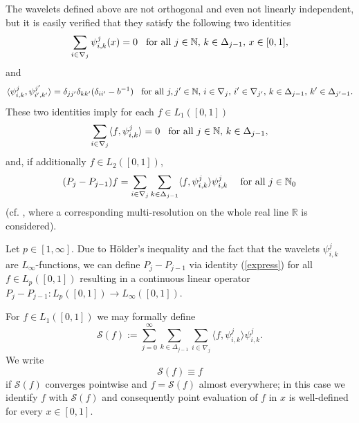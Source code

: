 \documentclass[12pt]{article}
\newcommand{\NN}{\mathbb{N}}
\newcommand{\RR}{\mathbb{R}}
\begin{document}
The wavelets defined above are not orthogonal and even not linearly independent, but it is easily verified that they satisfy the following
two identities
\begin{equation}
\label{HHY6}
\sum_{i\in\nabla_j} \psi^j_{i,k}(x) = 0
\hspace{2ex}
\text{for all $j \in\NN$, $k\in\Delta_{j-1}$, $x\in [0,1]$,}
\end{equation}
and
\begin{equation}
\label{HHY7}
\langle \psi^j_{i,k}, \psi^{j'}_{i',k'} \rangle
= \delta_{jj'}\delta_{kk'}(\delta_{ii'}-b^{-1})
\hspace{2ex}
\text{for all $j,j' \in\NN$, $i\in \nabla_{j}$, $i'\in \nabla_{j'}$, $k\in\Delta_{j-1}$, $k'\in \Delta_{j'-1}$.}
\end{equation}
These two identities imply  for each $f\in L_{1}([0,1])$
\begin{equation}\label{fourier_sum_zero}
\sum_{i\in\nabla_j} \langle f, \psi^j_{i,k} \rangle = 0
\hspace{2ex}
\text{for all $j \in\NN$, $k\in\Delta_{j-1}$},
\end{equation}
and, if additionally $f\in L_{2}([0,1])$, 
\begin{equation}
\label{express}
(P_j-P_{j-1})f = \sum_{i\in\nabla_j} \sum_{k\in\Delta_{j-1}}
\langle f, \psi^j_{i,k} \rangle \psi^j_{i,k}
\hspace{3ex}\text{for all $j\in\NN_0$}
\end{equation}
(cf. \cite[Lemma~3]{Owen97}, where a corresponding
multi-resolution on the whole real line $\RR$ is considered).

Let $p\in [1, \infty]$. Due to H\"older's inequality and the fact that the wavelets $\psi^j_{i,k}$ are $L_\infty$-functions, 
we can define $P_j-P_{j-1}$ via identity (\ref{express}) for all $f\in L_p([0,1])$ resulting in a continuous linear operator $P_j-P_{j-1}: L_p([0,1]) \to L_\infty([0,1])$. 

For $f\in L_1([0,1])$ we may formally define 
\begin{equation}\label{sf_1}
\mathcal{S}(f) := \sum^\infty_{j=0} \sum_{k\in \Delta_{j-1}}
\sum_{i\in \nabla_{j}} \langle f, \psi^{j}_{i,k} \rangle
\psi^{j}_{i,k}.
\end{equation}
We write 
$$
\mathcal{S}(f) \equiv f
$$ 
if $\mathcal{S}(f)$ converges pointwise and $f= \mathcal{S}(f)$ almost everywhere;
in this case we identify $f$ with $\mathcal{S}(f)$ and consequently point evaluation of $f$ in $x$ is well-defined for 
every $x\in [0,1]$. 
\end{document}
